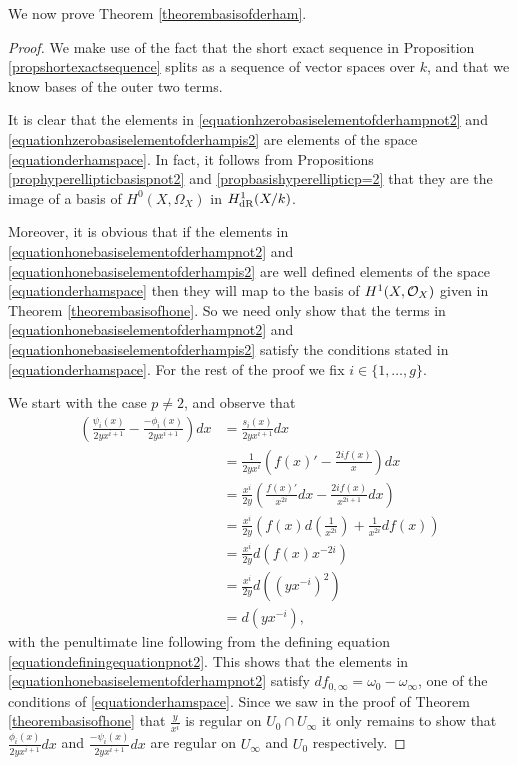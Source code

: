 We now prove Theorem \ref{theorembasisofderham}.

    \begin{proof}
    We make use of the fact that the short exact sequence in Proposition \ref{propshortexactsequence} splits as a sequence of vector spaces over $k$, and that we know bases of the outer two terms.
    
    It is clear that the elements in \eqref{equationhzerobasiselementofderhampnot2} and \eqref{equationhzerobasiselementofderhampis2} are elements of the space \eqref{equationderhamspace}. 
    In fact, it follows from Propositions \ref{prophyperellipticbasispnot2} and \ref{propbasishyperellipticp=2} that they are the image of a basis of $H^0(X,\Omega_X)$ in $H_{\text {dR}}^1(X/k)$.
    
    Moreover, it is obvious that if the elements in \eqref{equationhonebasiselementofderhampnot2} and \eqref{equationhonebasiselementofderhampis2} are well defined elements of the space \eqref{equationderhamspace} then they will map to the basis of $H^1(X,\mathcal{O}_X)$ given in Theorem \ref{theorembasisofhone}.
    So we need only show that the terms in \eqref{equationhonebasiselementofderhampnot2} and \eqref{equationhonebasiselementofderhampis2} satisfy the conditions stated in \eqref{equationderhamspace}.
    For the rest of the proof we fix $i \in \{1, \ldots ,g\}$.
    
    
    We start with the case $p\neq 2$, and observe that
        \begin{align*}
        \left(  \frac{\psi_i(x)}{2yx^{i+1}}  - \frac{-\phi_i(x)}{2yx^{i+1}} \right) dx & =  \frac{s_i(x)}{2yx^{i+1}} dx \\
        & =  \frac{1}{2yx^i} \left( f(x)' - \frac{2if(x)}{x} \right) dx \\
        & =  \frac{x^i}{2y} \left( \frac{f(x)'}{x^{2i}}dx -\frac{2if(x)}{x^{2i+1}} dx \right) \\
        & =  \frac{x^i}{2y} \left( f(x)d\left(\frac{1}{x^{2i}}\right) + \frac{1}{x^{2i}}df(x) \right) \\
        & =  \frac{x^i}{2y}d(f(x)x^{-2i}) \\
        & =  \frac{x^i}{2y} d\left(\left(yx^{-i}\right)^2\right) \\
        & =  d(yx^{-i}),
        \end{align*}
    with the penultimate line following from the defining equation \eqref{equationdefiningequationpnot2}.
    This shows that the elements in \eqref{equationhonebasiselementofderhampnot2} satisfy $df_{0, \infty} = \omega_0 - \omega_\infty$, one of the conditions of \eqref{equationderhamspace}.
    Since we saw in the proof of Theorem \ref{theorembasisofhone} that $\frac{y}{x^i}$ is regular on $U_0\cap U_\infty$ it only remains to show that $\frac{\phi_i(x)}{2yx^{i+1}}dx$ and $\frac{-\psi_i(x)}{2yx^{i+1}}dx$ are regular on $U_\infty$ and $U_0$ respectively.
    

\end{proof}
